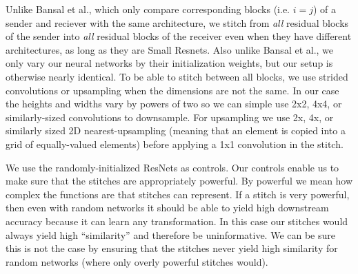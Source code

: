 \documentclass{article}
\begin{document}
Unlike Bansal et al., which only compare corresponding blocks (i.e. $i = j$) of a sender and
reciever with the same architecture,
we stitch from \textit{all} residual blocks of the sender into
\textit{all} residual blocks of the receiver even when they have different architectures, as long as
they are Small Resnets. Also unlike Bansal et al., we only vary
our neural networks by their initialization weights, but our setup is otherwise nearly identical. To
be able to stitch between all blocks, we use strided convolutions or upsampling when the dimensions
are not the same.
In our case the heights and widths vary by powers of two so we can simple use 2x2, 4x4,
or similarly-sized convolutions to downsample. For upsampling we use 2x, 4x, or similarly
sized 2D nearest-upsampling (meaning that an element is copied into a grid of equally-valued elements)
before applying a 1x1 convolution in the stitch.

We use the randomly-initialized ResNets as controls. Our controls enable us to make sure that
the stitches are appropriately powerful. By powerful we mean how complex the functions are that
stitches can represent. If a stitch is very powerful, then even with random networks it should be able to
yield high downstream accuracy because it can learn any transformation. In this case our 
stitches would always yield high ``similarity'' and therefore be uninformative.
We can be sure this is not the case by ensuring that
the stitches never yield high similarity for random networks (where only overly powerful stitches
would).
\end{document}
